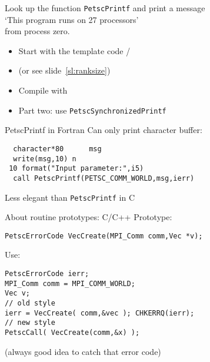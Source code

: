 \begin{exerciseframe}[hello]
Look up the function \lstinline{PetscPrintf} and print a message\\
`This program runs on 27 processors'\\
from process zero.

\begin{itemize}
\item Start with the template code /
\item (or see slide~\ref{sl:ranksize})
\item Compile with 
\item Part two: use \lstinline{PetscSynchronizedPrintf}
\end{itemize}
\end{exerciseframe}


\begin{fortran}
\begin{numberedframe}{PetscPrintf in Fortran}
Can only print character buffer:
\begin{lstlisting}
  character*80      msg
  write(msg,10) n
 10 format("Input parameter:",i5)
  call PetscPrintf(PETSC_COMM_WORLD,msg,ierr)
\end{lstlisting}
Less elegant than \lstinline{PetscPrintf} in C
\end{numberedframe}
\end{fortran}

\begin{c}
\begin{numberedframe}{About routine prototypes: C/C++}
  \label{sec:protos}
Prototype:
\begin{lstlisting}
PetscErrorCode VecCreate(MPI_Comm comm,Vec *v);
\end{lstlisting}
Use:
\begin{lstlisting}
PetscErrorCode ierr;
MPI_Comm comm = MPI_COMM_WORLD;
Vec v;
// old style
ierr = VecCreate( comm,&vec ); CHKERRQ(ierr);
// new style
PetscCall( VecCreate(comm,&x) );
\end{lstlisting}
(always good idea to catch that error code)
\end{numberedframe}
\end{c}

